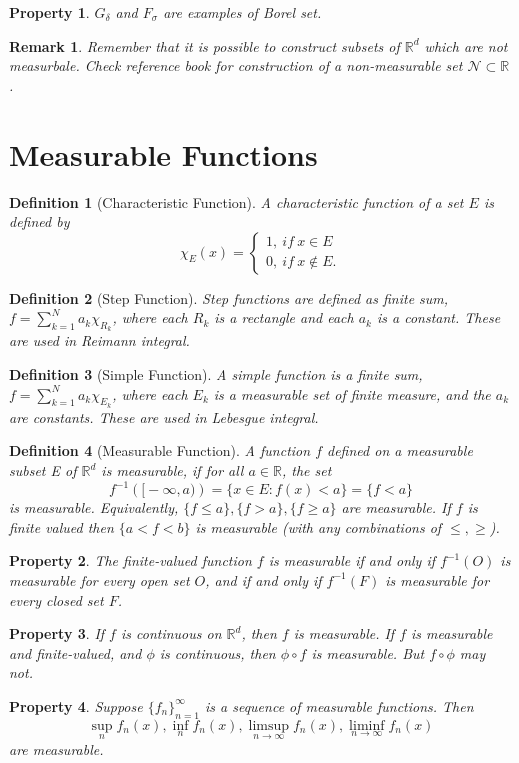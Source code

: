 \documentclass{report}
\theoremstyle{upthm}
\newtheorem{defn}{Definition}
\newtheorem{remark}{Remark}
\newtheorem{property}{Property}
\newcommand{\reals}{\mathbb{R}}
\newcommand{\calN}{{\mathcal{N}}}
\newcommand{\set}[1]{\big\lbrace #1 \big\rbrace}
\begin{document}
\begin{property}
	$G_\delta$ and $F_\sigma$ are examples of Borel set.
\end{property}

\begin{remark}
	Remember that it is possible to construct subsets of $\reals^d$ which are not measurbale. Check reference book for construction of a non-measurable set $\calN \subset \reals$. 
\end{remark}
\section{Measurable Functions}
\begin{defn}[Characteristic Function]
	A characteristic function of a set $E$ is defined by 
	$$
	 \chi_E(x) = \begin{cases}
	1,\ if\ x \in E \\
	0,\ if\ x \notin E.
	\end{cases}
	$$
\end{defn}
\begin{defn}[Step Function]
	Step functions are defined as finite sum, $ f = \sum_{k=1}^{N} a_k \chi_{R_k} $, where each $R_k$ is a rectangle and each $a_k$ is a constant. These are used in Reimann integral.
\end{defn}
\begin{defn}[Simple Function]
	A simple function is a finite sum,  $ f = \sum_{k=1}^{N} a_k \chi_{E_k} $, where each $E_k$ is a measurable set of finite measure, and the $a_k$ are constants. These are used in Lebesgue integral.
\end{defn}

\begin{defn}[Measurable Function]
	A function $f$ defined on a measurable subset E of $\reals^d$ is measurable,
	if for all $ a \in \reals$, the set
	$$f^{-1}(\big[-\infty, a\big)) = \set{x \in E: f(x) < a} = \set{f < a}$$ is measurable. Equivalently, $\set{f \leq a}, \set{f > a}, \set{f \geq a}$ are measurable. If $f$ is finite valued then $\set{a < f < b}$ is measurable (with any combinations of $\leq, \geq$).
\end{defn} 
\begin{property}
	The finite-valued function $f$ is measurable if and only if $f^{-1}(O)$ is measurable for every open set $O$, and if and only if $f^{-1}(F)$ is measurable for every closed set $F$.
\end{property}
\begin{property}
	If $f$ is continuous on $\reals^d$, then $f$ is measurable. If $f$ is measurable and finite-valued, and $\phi$ is continuous, then  $\phi \circ f$ is measurable. But $f \circ \phi$ may not.
\end{property}
\begin{property}
	Suppose $\set{f_n}_{n=1}^\infty$ is a sequence of measurable functions. Then $$\sup_n f_n(x), \inf_n f_n(x), \limsup_{n \rightarrow \infty} f_n(x), \liminf_{n \rightarrow \infty} f_n(x)  $$ are measurable.
\end{property}
\end{document}
